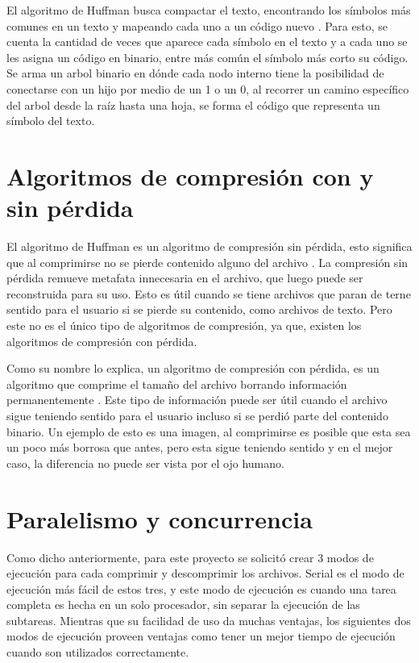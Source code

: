 \documentclass{report}
\begin{document}
El algoritmo de Huffman busca compactar el texto, encontrando los símbolos más comunes en un texto y mapeando cada uno a un código nuevo \cite{ref3}.
Para esto, se cuenta la cantidad de veces que aparece cada símbolo en el texto y a cada uno se les asigna un código en binario, entre más común el símbolo más corto su código.
Se arma un arbol binario en dónde cada nodo interno tiene la posibilidad de conectarse con un hijo por medio de un 1 o un 0, al recorrer un camino específico del arbol desde la raíz hasta una hoja, se forma el código que representa un símbolo del texto. 



\section {Algoritmos de compresión con y sin pérdida}

El algoritmo de Huffman es un algoritmo de compresión sin pérdida, esto significa que al comprimirse no se pierde contenido alguno del archivo \cite{ref4}.
La compresión sin pérdida remueve metafata innecesaria en el archivo, que luego puede ser reconstruida para su uso.
Esto es útil cuando se tiene archivos que paran de terne sentido para el usuario si se pierde su contenido, como archivos de texto.
Pero este no es el único tipo de algoritmos de compresión, ya que, existen los algoritmos de compresión con pérdida.

Como su nombre lo explica, un algoritmo de compresión con pérdida, es un algoritmo que comprime el tamaño del archivo borrando información permanentemente \cite{ref4}.
Este tipo de información puede ser útil cuando el archivo sigue teniendo sentido para el usuario incluso si se perdió parte del contenido binario.
Un ejemplo de esto es una imagen,  al comprimirse es posible que esta sea un poco más borrosa que antes, pero esta sigue teniendo sentido y en el mejor caso, la diferencia no puede ser vista por el ojo humano.


\section{Paralelismo y concurrencia}

Como dicho anteriormente, para este proyecto se solicitó crear 3 modos de ejecución para cada comprimir y descomprimir los archivos. 
Serial es el modo de ejecución más fácil de estos tres, y este modo de ejecución es cuando una tarea completa es hecha en un solo procesador, sin separar la ejecución de las subtareas.
Mientras que su facilidad de uso da muchas ventajas, los siguientes dos modos de ejecución proveen ventajas como tener un mejor tiempo de ejecución cuando son utilizados correctamente.
\end{document}
